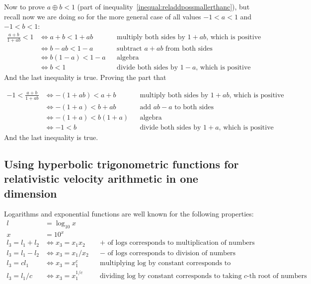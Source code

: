 \documentclass[a4paper]{article}
\theoremstyle{plain}
\theoremstyle{definition}
\begin{document}
Now to prove $a \oplus b < 1$ (part of
inequality~\eqref{inequal:reladdpossmallerthanc}), but recall now we
are doing so for the more general case of all values $-1 < a < 1$ and
$-1 < b < 1$:
\begin{align*}
\frac{a+b}{1+ab} < 1
  & \Leftrightarrow a+b < 1+ab & & \text{multiply both sides by $1+ab$, which is positive} \\
  & \Leftrightarrow b-ab < 1-a & & \text{subtract $a+ab$ from both sides} \\
  & \Leftrightarrow b(1-a) < 1-a & & \text{algebra} \\
  & \Leftrightarrow b < 1 & & \text{divide both sides by $1-a$, which is positive}
\end{align*}
And the last inequality is true.  Proving the part that

\begin{align*}
-1 < \frac{a+b}{1+ab}
  & \Leftrightarrow -(1+ab) < a+b & & \text{multiply both sides by $1+ab$, which is positive} \\
  & \Leftrightarrow -(1+a) < b+ab & & \text{add $ab-a$ to both sides} \\
  & \Leftrightarrow -(1+a) < b(1+a) & & \text{algebra} \\
  & \Leftrightarrow -1 < b & & \text{divide both sides by $1+a$, which is positive}
\end{align*}
And the last inequality is true.


\subsection{Using hyperbolic trigonometric functions for relativistic velocity arithmetic in one dimension}
\label{app:1drelVelocityUsingHyperbolicTrig}

Logarithms and exponential functions are well known for the following
properties:
\begin{align*}
l & = \log_{10} x \\
x & = 10^x \\
l_3 = l_1 + l_2 & \Leftrightarrow x_3 = x_1 x_2 & & \text{$+$ of logs corresponds to multiplication of numbers} \\
l_3 = l_1 - l_2 & \Leftrightarrow x_3 = x_1 / x_2 & & \text{$-$ of logs corresponds to division of numbers} \\
l_3 = c l_1 & \Leftrightarrow x_3 = x_1^c & & \text{multiplying log by constant corresponds to exponentiation of numbers} \\
l_3 = l_1/c & \Leftrightarrow x_3 = x_1^{1/c} & & \text{dividing log by constant corresponds to taking $c$-th root of numbers} \\
\end{align*}
\end{document}
